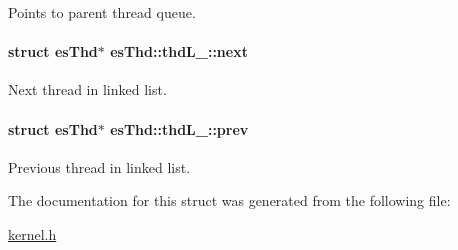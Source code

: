 Points to parent thread queue. 

\hypertarget{structesThd_1_1thdL___accf72efa113ca485b742791d680d92bb}{
\paragraph[{next}]{\setlength{\rightskip}{0pt plus 5cm}struct {\bf es\-Thd}$\ast$ es\-Thd\-::thd\-L\-\_\-\-::next}}\label{structesThd_1_1thdL___accf72efa113ca485b742791d680d92bb}


Next thread in linked list. 

\hypertarget{structesThd_1_1thdL___a1c3a34dae1d17063950b672684c5917e}{
\paragraph[{prev}]{\setlength{\rightskip}{0pt plus 5cm}struct {\bf es\-Thd}$\ast$ es\-Thd\-::thd\-L\-\_\-\-::prev}}\label{structesThd_1_1thdL___a1c3a34dae1d17063950b672684c5917e}


Previous thread in linked list. 



The documentation for this struct was generated from the following file\-:\begin{DoxyCompactItemize}
\item 
\hyperlink{kernel_8h}{kernel.\-h}\end{DoxyCompactItemize}
